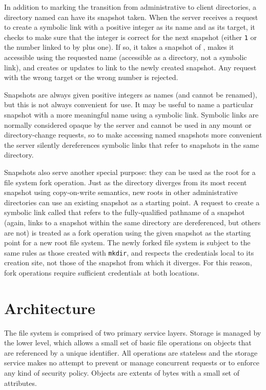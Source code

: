In addition to marking the transition from administrative to client directories, a directory named \current can have its snapshot taken. When the server receives a request to create a symbolic link with a positive integer as its name and \current as its target, it checks to make sure that the integer is correct for the next snapshot (either \texttt{1} or the number linked to by \snapshot plus one). If so, it takes a snapshot of \current, makes it accessible using the requested name (accessible as a directory, not a symbolic link), and creates or updates \snapshot to link to the newly created snapshot. Any request with the wrong target or the wrong number is rejected.

Snapshots are always given positive integers as names (and cannot be renamed), but this is not always convenient for use. It may be useful to name a particular snapshot with a more meaningful name using a symbolic link. Symbolic links are normally considered opaque by the server and cannot be used in any mount or directory-change requests, so to make accessing named snapshots more convenient the server silently dereferences symbolic links that refer to snapshots in the same directory.

Snapshots also serve another special purpose: they can be used as the root for a file system fork operation. Just as the \current directory diverges from its most recent snapshot using copy-on-write semantics, new \current roots in other administrative directories can use an existing snapshot as a starting point. A request to create a symbolic link called \current that refers to the fully-qualified pathname of a snapshot (again, links to a snapshot within the same directory are dereferenced, but others are not) is treated as a fork operation using the given snapshot as the starting point for a new root file system. The newly forked file system is subject to the same rules as those created with \texttt{mkdir}, and respects the credentials local to its creation site, not those of the snapshot from which it diverges. For this reason, fork operations require sufficient credentials at both locations.

\section{Architecture}

The file system is comprised of two primary service layers. Storage is managed by the lower level, which allows a small set of basic file operations on objects that are referenced by a unique identifier. All operations are stateless and the storage service makes no attempt to prevent or manage concurrent requests or to enforce any kind of security policy. Objects are extents of bytes with a small set of attributes.

